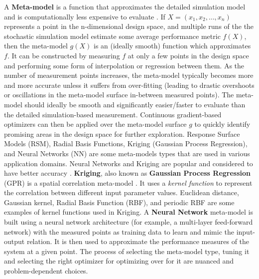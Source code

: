 A \textbf{Meta-model} is a function that approximates the detailed simulation model and is computationally less expensive to evaluate \cite{barton2020tutorial}. If $X = (x_1, x_2, \dots, x_n)$ represents a point in the n-dimensional design space, and multiple runs of the the stochastic simulation model estimate some average performance metric $f(X)$, then the meta-model $g(X)$ is an (ideally smooth) function which approximates $f$.  It can be constructed by measuring $f$ at only a few  points in the design space and performing some form of interpolation or regression between them. As the number of measurement points increases, the meta-model typically becomes more and more accurate unless it suffers from over-fitting (leading to drastic overshoots or oscillations in the meta-model surface in-between measured points). The meta-model should ideally be smooth and significantly easier/faster  to evaluate than the detailed simulation-based measurement.  Continuous gradient-based optimizers can then be applied over the meta-model surface $g$ to quickly identify promising areas in the design space for further exploration.  Response Surface Models (RSM), Radial Basis Functions, Kriging (Gaussian Process Regression), and Neural Networks (NN) are some meta-models types that are used in various application domains.  Neural Networks and Kriging are popular and considered to have better accuracy \cite{barkanyi2021modelling}.  \textbf{Kriging}, also known as \textbf{Gaussian Process Regression }(GPR) is a spatial correlation meta-model \cite{kleijnen2009kriging,ankenman2008stochastic}. It uses a \textit{kernel function} to represent the  correlation between different input parameter values. Euclidean distance, Gaussian kernel, Radial Basis Function (RBF), and periodic RBF are some examples of kernel functions used in Kriging. A \textbf{Neural Network} meta-model is built using a neural network architecture (for example, a multi-layer feed-forward network) with the measured points as training data to learn and mimic the input-output relation. It is then used to approximate the performance measures of the system at a given point. The process of selecting the meta-model type, tuning it and selecting the right optimizer for optimizing over for it are nuanced and problem-dependent choices. 


